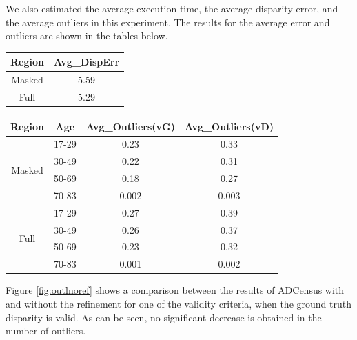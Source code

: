 We also estimated the average execution time, the average disparity error, and the average outliers in this experiment. The results for 
the average error and outliers are shown in the tables below.

\begin{minipage}{0.8\linewidth}
\begin{center}
\label{tab:adcerrNref}
\begin{tabular}{|c|c|}
\hline
Region & Avg\_DispErr \\ \hline
Masked & 5.59 \\  \hline
Full & 5.29 \\ \hline
\end{tabular}
\end{center}
\end{minipage} \newline

\begin{minipage}{0.8\linewidth}
\begin{center}
\label{tab:adcoutlNref}
\begin{tabular}{ |c|c|c|c| }
\hline
Region & Age &  Avg\_Outliers(vG) & Avg\_Outliers(vD)  \\ \hline
\multirow{4}{*}{Masked} & 17-29 & 0.23 & 0.33 \\
& 30-49 & 0.22 & 0.31 \\
& 50-69 & 0.18 & 0.27 \\
& 70-83 & 0.002 & 0.003 \\ \hline
\multirow{4}{*}{Full} & 17-29 & 0.27 & 0.39 \\
& 30-49 & 0.26 & 0.37 \\
& 50-69 & 0.23 & 0.32 \\
& 70-83 & 0.001 & 0.002 \\ \hline
\end{tabular}
\end{center}
\end{minipage} \newline

Figure \ref{fig:outlnoref} shows a comparison between the results of ADCensus with and without the refinement 
for one of the validity criteria, when the ground truth disparity is valid. As can be seen, no significant decrease is obtained in the number of outliers.

